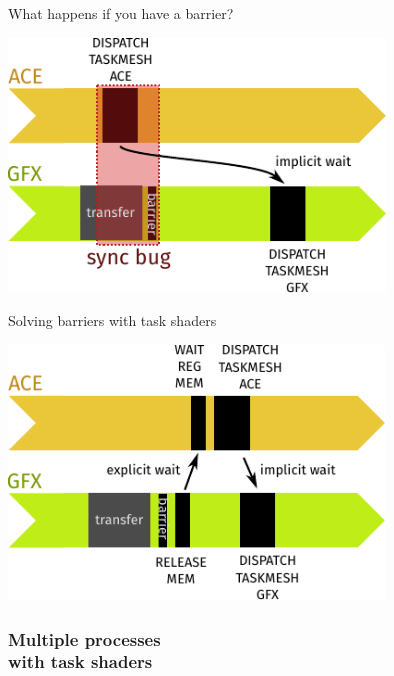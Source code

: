 \documentclass[aspectratio=169,t,xcolor=table]{beamer}
\begin{document}
\begin{frame}{What happens if you have a barrier?}

    \LARGE

    \begin{center}
        \includegraphics[height=6.75cm]{figs/task_sync_4.svg.pdf}
    \end{center}

\end{frame}

\begin{frame}{Solving barriers with task shaders}

    \LARGE

    \begin{center}
        \includegraphics[height=6.75cm]{figs/task_sync_5.svg.pdf}
    \end{center}

\end{frame}

\begin{frame}{}
    \frametitle{Multiple processes \\ with task shaders}
\end{frame}
\end{document}

